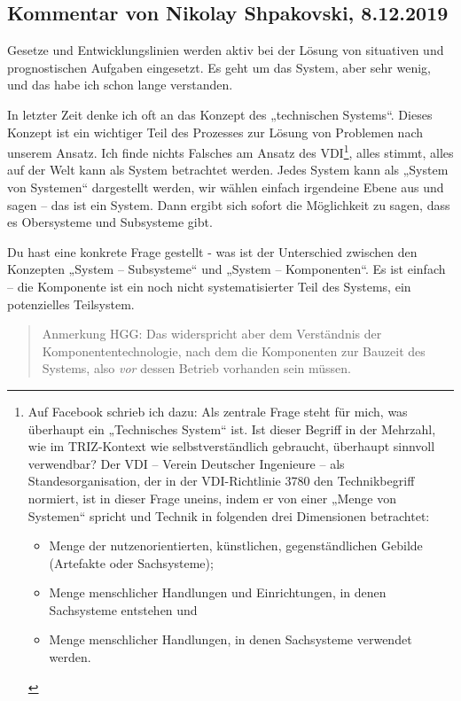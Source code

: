 \documentclass[11pt,a4paper]{article}
\begin{document}
\subsection{Kommentar von Nikolay Shpakovski, 8.12.2019}

Gesetze und Entwicklungslinien werden aktiv bei der Lösung von situativen und
prognostischen Aufgaben eingesetzt. Es geht um das System, aber sehr wenig,
und das habe ich schon lange verstanden.

In letzter Zeit denke ich oft an das Konzept des „technischen Systems“. Dieses
Konzept ist ein wichtiger Teil des Prozesses zur Lösung von Problemen nach
unserem Ansatz. Ich finde nichts Falsches am Ansatz des VDI\footnote{Auf
  Facebook schrieb ich dazu: Als zentrale Frage steht für mich, was überhaupt
  ein „Technisches System“ ist. Ist dieser Begriff in der Mehrzahl, wie im
  TRIZ-Kontext wie selbstverständlich gebraucht, überhaupt sinnvoll
  verwendbar? Der VDI -- Verein Deutscher Ingenieure -- als
  Standesorganisation, der in der VDI-Richtlinie 3780 den Technikbegriff
  normiert, ist in dieser Frage uneins, indem er von einer „Menge von
  Systemen“ spricht und Technik in folgenden drei Dimensionen betrachtet: 
  \begin{itemize}
  \item Menge der nutzenorientierten, künstlichen, gegenständlichen Gebilde
    (Artefakte oder Sachsysteme);
  \item Menge menschlicher Handlungen und Einrichtungen, in denen Sachsysteme
    entstehen und
  \item Menge menschlicher Handlungen, in denen Sachsysteme verwendet werden.
  \end{itemize}}, alles stimmt, alles auf der Welt kann als System betrachtet
werden.  Jedes System kann als „System von Systemen“ dargestellt werden, wir
wählen einfach irgendeine Ebene aus und sagen -- das ist ein System.  Dann
ergibt sich sofort die Möglichkeit zu sagen, dass es Obersysteme und
Subsysteme gibt.

Du hast eine konkrete Frage gestellt - was ist der Unterschied zwischen den
Konzepten „System -- Subsysteme“ und „System -- Komponenten“. Es ist einfach
-- die Komponente ist ein noch nicht systematisierter Teil des Systems, ein
potenzielles Teilsystem.
\begin{quote}
  Anmerkung HGG: Das widerspricht aber dem Verständnis der
  Komponententechnologie, nach dem die Komponenten zur Bauzeit des Systems,
  also \emph{vor} dessen Betrieb vorhanden sein müssen.
\end{quote}
\end{document}
